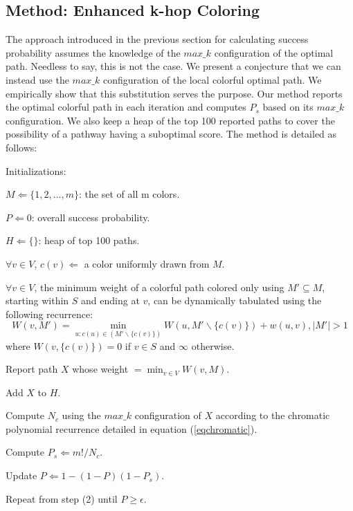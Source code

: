 \documentclass{ws-procs11x85}
\begin{document}
\subsection{Method: Enhanced k-hop Coloring}
The approach introduced in the previous section for calculating success
probability assumes the knowledge of the $max\_k$ configuration of the optimal
path. Needless to say, this is not the case. We present a conjecture that we
can instead use the $max\_k$ configuration of the local colorful optimal path.
We empirically show that this substitution serves the purpose. Our method reports
the optimal colorful path in each iteration and computes $P_s$ based on its
$max\_k$ configuration. We also keep a heap of the top 100 reported paths to
cover the possibility of a pathway having a suboptimal score. The method is
detailed as follows:
\begin{arabiclist}[9]
\item Initializations:
	\begin{romanlist}[iii]
	\item $M \Leftarrow \{1, 2, . . . , m\}$: the set of all m colors.
	\item $P \Leftarrow 0$: overall success probability.
	\item $H \Leftarrow \{\}$: heap of top 100 paths.
	\end{romanlist}
\item $\forall v \in V$, $c(v) \Leftarrow$ a color uniformly drawn from $M$.
\item $\forall v \in V$, the minimum weight of a colorful path colored only
using $M' \subseteq M$, starting within $S$ and ending at $v$, can be
dynamically tabulated using the following recurrence\cite{scott}:
\begin{equation}
W(v, M') = \min_{u:c(u) \in (M' \backslash \{c(v)\})} W(u, M' \backslash
\{c(v)\}) + w(u, v), |M'| > 1
\end{equation}
where $W(v, \{c(v)\}) = 0$ if $v \in S$ and $\infty$ otherwise.
\item Report path $X$ whose weight $= \min_{v \in V} W(v, M)$.
\item Add $X$ to $H$.
\item Compute $N_c$ using the $max\_k$ configuration of $X$ according to the
chromatic polynomial recurrence detailed in equation (\ref{eqchromatic}).
\item Compute $P_s \Leftarrow m! / N_c$.
\item Update $P \Leftarrow 1 - (1 - P)(1 - P_s)$.
\item Repeat from step (2) until $P \geq \epsilon$.
\end{arabiclist}
\end{document}
